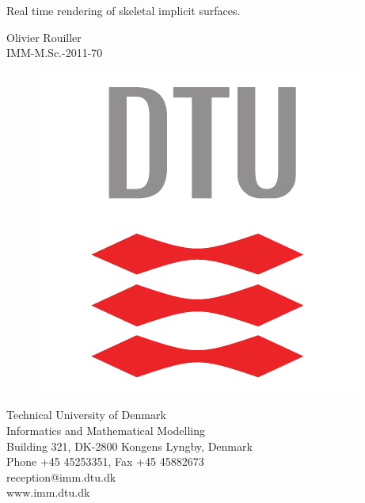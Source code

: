\begin{titlepage}
		{\centering \parindent=0pt
		\newcommand{\HRule}{\rule{\textwidth}{1mm}}
		 \LARGE%
		Real time rendering of skeletal implicit surfaces.\\[0.7cm]
		\large 
		
			Olivier Rouiller\\
			\normalsize 
			IMM-M.Sc.-2011-70
			 
   		
   		}

		 \normalsize %
   		\begin{figure}
   			\vspace{-35pt}
   			\begin{center}
   				\includegraphics[scale=0.3]{../../figs/DTU.pdf}
   			\end{center}
   		\end{figure}
		
		\noindent Technical University of Denmark\\
					Informatics and Mathematical Modelling\\
					Building 321, DK-2800 Kongens Lyngby, Denmark\\
					Phone +45 45253351, Fax +45 45882673\\
					reception@imm.dtu.dk\\
					www.imm.dtu.dk\\
   		\FloatBarrier
\end{titlepage}
\newpage
